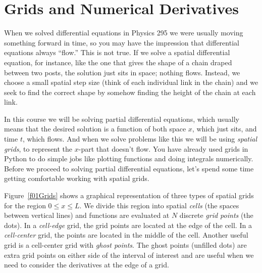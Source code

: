 \chapter[Grids and Numerical Derivatives]{Grids and Numerical Derivatives}
\label{ch:grids}

When we solved differential equations in Physics 295 we were usually
moving something forward in time, so you may have the impression that
differential equations always ``flow.'' This is not true. If we solve
a spatial differential equation, for instance, like the one that
gives the shape of a chain draped between two posts, the solution
just sits in space; nothing flows. Instead, we choose a small spatial
step size (think of each individual link in the chain) and we seek to
find the correct shape by somehow finding the height of the chain at
each link.

In this course we will be solving partial differential equations,
which usually means that the desired solution is a function of both
space $x$, which just sits, and time $t$, which flows.
 And when we solve problems like this we will
be using {\it spatial grids}, to represent the $x$-part that
doesn't flow. You have already used grids in Python to do simple
jobs like plotting functions and doing integrals numerically.
Before we proceed to solving partial differential equations, let's
spend some time getting comfortable working with spatial grids.



Figure~\ref{f01Grids} shows a graphical representation of three
types of spatial grids for the region $0 \le x \le L$.  We divide
this region into spatial \emph{cells} (the spaces between vertical
lines) and functions are evaluated at $N$ discrete \emph{grid
points} (the dots). In a \emph{cell-edge} grid, the grid points are located at the
edge of the cell.  In a \emph{cell-center} grid, the points are located in the middle
of the cell.  Another useful grid is a cell-center grid with {\it
ghost points}. The ghost points (unfilled dots)
are extra grid points on either side of the interval of interest
and are useful when we need to consider the derivatives at the edge
of a grid.

